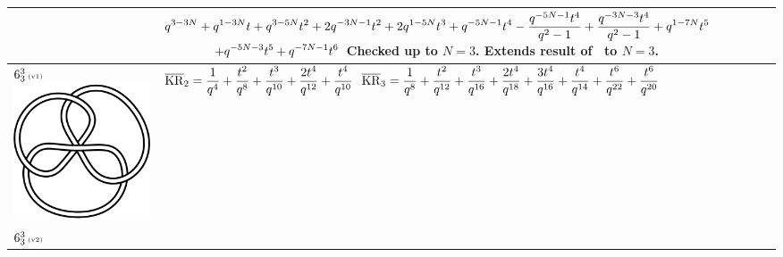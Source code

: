 \documentclass{compositio}
\theoremstyle{definition}
\numberwithin{equation}{section}
\begin{document}
{\begin{longtable}{p{}|p{}}
& 
$
\displaystyle{%
q^{3-3 N}+q^{1-3 N} t+q^{3-5 N} t^2+2 q^{-3 N-1} t^2+2 q^{1-5 N} t^3+q^{-5 N-1} t^4-\frac{q^{-5 N-1} t^4}{q^2-1}+\frac{q^{-3 N-3} t^4}{q^2-1}+q^{1-7 N} t^5
}
$
\newline
$
\displaystyle{%
\qquad\qquad +q^{-5 N-3} t^5+q^{-7 N-1} t^6
}
$
\newline\newline\newline
Checked up to $N=3$. Extends result of~\cite{r0508510} to $N=3$. 
\\
\hline
$6_{3}^3\,\text{{\tiny (v1)}}$
\includegraphics[scale=0.07,angle=0]{link6_3_3.pdf} 
& 
$
\displaystyle{%
\overline{\KR}_{2} = \frac{1}{q^4}+\frac{t^2}{q^8}+\frac{t^3}{q^{10}}+\frac{2 t^4}{q^{12}}+\frac{t^4}{q^{10}}
}
$
\newline 
$
\displaystyle{%
\overline{\KR}_{3} = \frac{1}{q^8}+\frac{t^2}{q^{12}}+\frac{t^3}{q^{16}}+\frac{2 t^4}{q^{18}}+\frac{3 t^4}{q^{16}}+\frac{t^4}{q^{14}}+\frac{t^6}{q^{22}}+\frac{t^6}{q^{20}}
}
$
\\
\hline
$6_{3}^3\,\text{{\tiny (v2)}}$

\end{longtable}}
\end{document}
